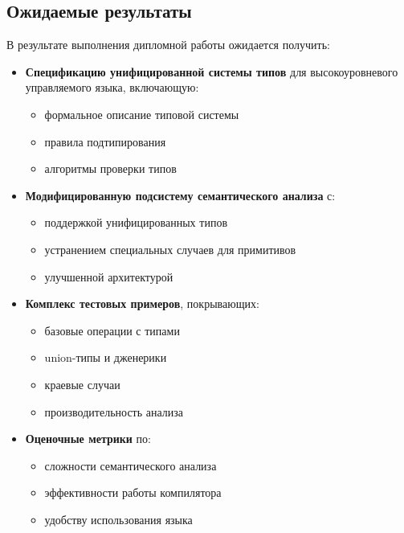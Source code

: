 \subsection{Ожидаемые результаты}
В результате выполнения дипломной работы ожидается получить:

\begin{itemize}
    \item \textbf{Спецификацию унифицированной системы типов} для высокоуровневого управляемого языка, включающую:
    \begin{itemize}[label={--}]
        \item формальное описание типовой системы
        \item правила подтипирования
        \item алгоритмы проверки типов
    \end{itemize}

    \item \textbf{Модифицированную подсистему семантического анализа} с:
    \begin{itemize}[label={--}]
        \item поддержкой унифицированных типов
        \item устранением специальных случаев для примитивов
        \item улучшенной архитектурой
    \end{itemize}

    \item \textbf{Комплекс тестовых примеров}, покрывающих:
    \begin{itemize}[label={--}]
        \item базовые операции с типами
        \item union-типы и дженерики
        \item краевые случаи
        \item производительность анализа
    \end{itemize}

    \item \textbf{Оценочные метрики} по:
    \begin{itemize}[label={--}]
        \item сложности семантического анализа
        \item эффективности работы компилятора
        \item удобству использования языка
    \end{itemize}
\end{itemize}

\newpage
